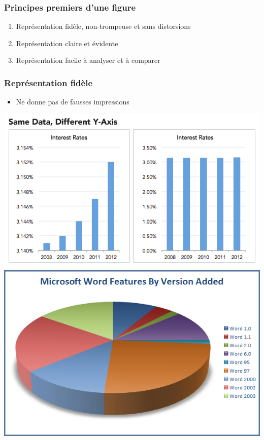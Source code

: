 \documentclass[aspectratio=169]{beamer}
\begin{document}





\begin{frame}[c]\frametitle{Principes premiers d'une figure}

\begin{enumerate}\setlength\itemsep{2em}
	\item Représentation fidèle, non-trompeuse et sans distorsions

	\item Représentation claire et évidente

	\item Représentation facile à analyser et à comparer
\end{enumerate}

\end{frame}



\begin{frame}[c]\frametitle{Représentation fidèle}
    

\begin{itemize}
	\item Ne donne pas de fausses impressions
\end{itemize}

\begin{center}
\includegraphics[width=.4\textwidth]{figures/misleading_chart.png}
\hspace{1cm}
\includegraphics[width=.4\textwidth]{figures/misleading-pie-chart.png}
\end{center}

\end{frame}
\end{document}
